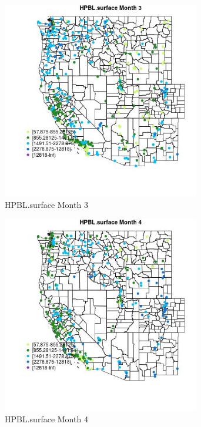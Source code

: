 \begin{figure} 
\centering  
\includegraphics[width=0.77\textwidth]{Code_Outputs/Report_ML_input_PM25_Step4_part_e_de_duplicated_aves_compiled_2019-05-18wNAs_MapObsMo3HPBLsurface.jpg} 
\caption{\label{fig:Report_ML_input_PM25_Step4_part_e_de_duplicated_aves_compiled_2019-05-18wNAsMapObsMo3HPBLsurface}HPBL.surface Month 3} 
\end{figure} 
 

\begin{figure} 
\centering  
\includegraphics[width=0.77\textwidth]{Code_Outputs/Report_ML_input_PM25_Step4_part_e_de_duplicated_aves_compiled_2019-05-18wNAs_MapObsMo4HPBLsurface.jpg} 
\caption{\label{fig:Report_ML_input_PM25_Step4_part_e_de_duplicated_aves_compiled_2019-05-18wNAsMapObsMo4HPBLsurface}HPBL.surface Month 4} 
\end{figure} 
 

